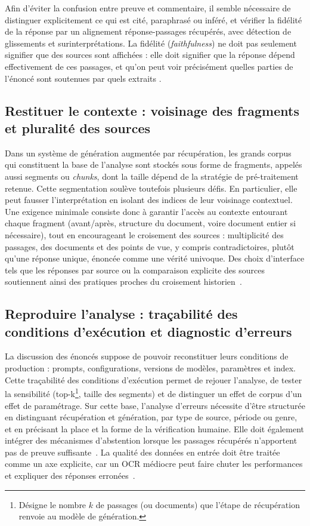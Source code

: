 \documentclass[final, fra]{anthology-ch}     %
\begin{document}
Afin d'éviter la confusion entre preuve et commentaire, il semble nécessaire de distinguer explicitement ce qui est cité, paraphrasé ou inféré, et vérifier la fidélité de la réponse par un alignement réponse-passages récupérés, avec détection de glissements et surinterprétations. 
La fidélité (\textit{faithfulness}) ne doit pas seulement signifier que des sources sont affichées : elle doit signifier que la réponse dépend effectivement de ces passages, et qu’on peut voir précisément quelles parties de l’énoncé sont soutenues par quels extraits \cite{wallat2025correctnessfaithfulness}.

\subsection{Restituer le contexte : voisinage des fragments et pluralité des sources}

Dans un système de génération augmentée par récupération, les grands corpus qui constituent la base de l’analyse sont stockés sous forme de fragments, appelés aussi segments ou \textit{chunks}, dont la taille dépend de la stratégie de pré-traitement retenue. 
Cette segmentation soulève toutefois plusieurs défis. 
En particulier, elle peut fausser l’interprétation en isolant des indices de leur voisinage contextuel. 
Une exigence minimale consiste donc à garantir l’accès au contexte entourant chaque fragment (avant/après, structure du document, voire document entier si nécessaire), tout en encourageant le croisement des sources : multiplicité des passages, des documents et des points de vue, y compris contradictoires, plutôt qu’une réponse unique, énoncée comme une vérité univoque. Des choix d’interface tels que les \og réponses par source \fg{} ou la comparaison explicite des sources soutiennent ainsi des pratiques proches du croisement historien~\cite{ravi2025exploringtrust}. 

\subsection{Reproduire l’analyse : traçabilité des conditions d’exécution et diagnostic d’erreurs}

La discussion des énoncés suppose de pouvoir reconstituer leurs conditions de production : prompts, configurations, versions de modèles, paramètres et index. 
Cette traçabilité des conditions d’exécution permet de rejouer l’analyse, de tester la sensibilité (top-k\footnote{Désigne le nombre $k$ de passages (ou documents) que l’étape de récupération renvoie au modèle de génération.}, taille des segments) et de distinguer un effet de corpus d’un effet de paramétrage. 
Sur cette base, l’analyse d’erreurs nécessite d'être structurée en distinguant récupération et génération, par type de source, période ou genre, et en précisant la place et la forme de la vérification humaine. 
Elle doit également intégrer des mécanismes d’abstention lorsque les passages récupérés n’apportent pas de preuve suffisante~\cite{ozaki2024confidenceRAG}. 
La qualité des données en entrée doit être traitée comme un axe explicite, car un OCR médiocre peut faire chuter les performances et expliquer des réponses erronées~\cite{piryani2024, bian-etal-2026-efficiently-explore}.
\end{document}
